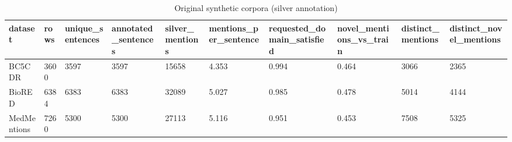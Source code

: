 \begin{table}[t]
\centering
\small
\begin{tabular}{llllllllll}
\hline
dataset & rows & unique\_sentences & annotated\_sentences & silver\_mentions & mentions\_per\_sentence & requested\_domain\_satisfied & novel\_mentions\_vs\_train & distinct\_mentions & distinct\_novel\_mentions \\
\hline
BC5CDR & 3600 & 3597 & 3597 & 15658 & 4.353 & 0.994 & 0.464 & 3066 & 2365 \\
BioRED & 6384 & 6383 & 6383 & 32089 & 5.027 & 0.985 & 0.478 & 5014 & 4144 \\
MedMentions & 7260 & 5300 & 5300 & 27113 & 5.116 & 0.951 & 0.453 & 7508 & 5325 \\
\hline
\end{tabular}
\caption{Original synthetic corpora (silver annotation)}
\label{tab:synthetic_corpora}
\end{table}
